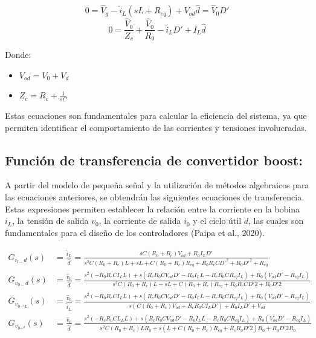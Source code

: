 \[0 = \hat{V}_g - \hat{i}_L(sL + R_{eq}) + V_{od} \hat{d} = \hat{V}_0 D'\]
\[0 = \frac{\hat{V}_0}{Z_c} + \frac{\hat{V}_0}{R_0} - \hat{i}_L D' + I_L \hat{d}\]

Donde:
\begin{itemize}
    \item \(V_{od} = V_0 + V_d\)
    \item \(Z_c = R_c + \frac{1}{sC}\)
\end{itemize}

Estas ecuaciones son fundamentales para calcular la eficiencia del sistema, ya que permiten identificar
el comportamiento de las corrientes y tensiones involucradas.

\subsection*{Función de transferencia de convertidor boost:}
A partir del modelo de pequeña señal y la utilización de métodos algebraicos para las ecuaciones
anteriores, se obtendrán las siguientes ecuaciones de transferencia. Estas expresiones permiten
establecer la relación entre la corriente en la bobina \(i_L\), la tensión de salida \(v_0\), la corriente de salida \(i_0\)
y el ciclo útil \(d\), las cuales son fundamentales para el diseño de los controladores (Paipa et al., 2020).

\begin{align*}
    G_{i_{l-} d}(s)   & = \frac{\hat{i}_L}{\hat{d}} = \frac{sC(R_0 + R_c)V_{od} + R_0 I_L D'}{s^2 C(R_0 + R_c)L + sL + C(R_0 + R_c)R_{eq} + R_0 R_c C D'^2 + R_0 D'^2 + R_{eq}}                                                                                \\
    G_{v_{0-} d}(s)   & = \frac{\hat{v}_0}{\hat{d}} = \frac{s^2(-R_0 R_c C I_L L) + s( R_c R_0 C V_{od} D' - R_0 I_L L - R_c R_0  C R_{eq} I_L) + R_0(V_{od} D' - R_{eq} I_L)}{s^2 C(R_0 + R_c)L + sL + C(R_0 + R_c)R_{eq} + R_0 R_c C D'2 + R_0 D'2}          \\
    G_{v_{0-^i L}}(s) & = \frac{\hat{v}_0}{\hat{i}_L} = \frac{s^2(-R_0 R_c C I_L L) + s( R_c R_0 C V_{od} D' - R_0 I_L L - R_c R_0  C R_{eq} I_L) + R_0(V_{od} D' - R_{eq} I_L)}{s(C(R_0 + R_c)V_{od} +  R_c R_0 CI_LD') + R_0I_LD' + V_{od}}                  \\
    G_{v_{0-^d}}(s)   & = \frac{\hat{v}_0}{\hat{d}} = \frac{s^2(-R_c R_0 C L_L L) + s( R_c R_0 C V_{od} D' - R_0 I_L L - R_c R_0  C R_{eq} I_L) + R_0(V_{od} D' - R_{eq} I_L)}{s^2 C(R_0 + R_c)LR_0 + s(L + C(R_0 + R_c)R_{eq} + R_c R_0D'2)R_0 + R_0 D'2 R_0} \\
\end{align*}

